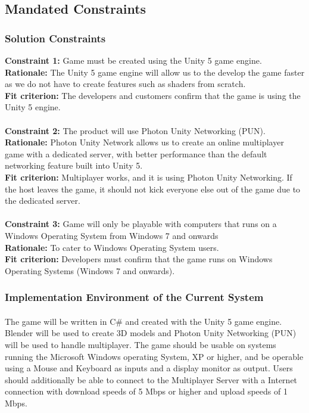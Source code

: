 \documentclass[12pt, titlepage]{article}
\begin{document}
\subsection{Mandated Constraints}
\subsubsection{Solution Constraints}
\textbf{Constraint 1:} Game must be created using the Unity 5 game engine.\\
\textbf{Rationale:} The Unity 5 game engine will allow us to the develop the game faster as we do not have to create features such as shaders from scratch.\\
\textbf{Fit criterion:} The developers and customers confirm that the game is using the Unity 5 engine.
\\\\
\textbf{Constraint 2:} The product will use Photon Unity Networking (PUN).\\
\textbf{Rationale:} Photon Unity Network allows us to create an online multiplayer game with a dedicated server, with better performance than the default networking feature built into Unity 5.\\
\textbf{Fit criterion:} Multiplayer works, and it is using Photon Unity Networking. If the host leaves the game, it should not kick everyone else out of the game due to the dedicated server.
\\\\
\textbf{Constraint 3:} Game will only be playable with computers that runs on a Windows Operating System from Windows 7 and onwards\\ 
\textbf{Rationale:} To cater to Windows Operating System users.\\
\textbf{Fit criterion:} Developers must confirm that the game runs on Windows Operating Systems (Windows 7 and onwards).

\subsubsection{Implementation Environment of the Current System}
\paragraph{}The game will be written in C\# and created with the Unity 5 game engine. Blender will be used to create 3D models and Photon Unity Networking (PUN) will be used to handle multiplayer. The game should be usable on systems running the Microsoft Windows operating System, XP or higher, and be operable using a Mouse and Keyboard as inputs and a display monitor as output. Users should additionally be able to connect to the Multiplayer Server with a Internet connection with download speeds of 5 Mbps or higher and upload speeds of 1 Mbps.
\end{document}
